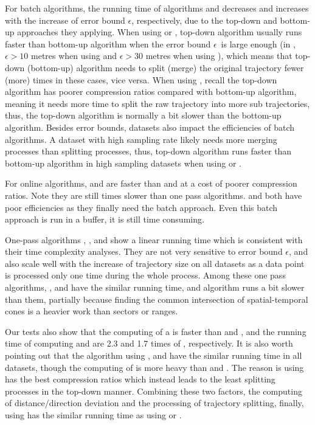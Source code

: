 For batch algorithms, the running time of algorithms \dpa and \tpa decreases and increases with the increase of error bound $\epsilon$, respectively, due to the top-down and bottom-up approaches they applying. When using \ped or \sed, top-down algorithm usually runs faster than bottom-up algorithm when the error bound $\epsilon$~is large enough (\eg in \geolife, $\epsilon >10$ metres when using \ped and $\epsilon >30$ metres when using \sed), which means that top-down (bottom-up) algorithm needs to split (merge) the original trajectory fewer (more) times in these cases, vice versa. When using \dad, recall the top-down algorithm has poorer compression ratios compared with bottom-up algorithm, meaning it needs more time to split the raw trajectory into more sub trajectories, thus, the top-down algorithm is normally a bit slower than the bottom-up algorithm.
Besides error bounds, datasets also impact the efficiencies of batch algorithms. A dataset with high sampling rate likely needs more merging processes than splitting processes, thus, top-down algorithm runs faster than bottom-up algorithm in high sampling datasets when using \ped or \sed.

For online algorithms, \fbqsa and \squishe are faster than \bqsa and \opwa at a cost of poorer compression ratios. Note they are still times slower than one pass algorithms. \bqsa and \opwa both have poor efficiencies as they finally need the batch approach. Even this batch approach is run in a buffer, it is still time consuming.

One-pass algorithms \operb, \siped, \cised and \interval show a linear running time which is consistent with their time complexity analyses. They are not very sensitive to error bound $\epsilon$, and also scale well with the increase of trajectory size on all datasets as a data point is processed only one time during the whole process.
Among these one pass algorithms, \siped, \operb and \interval have the similar running time, and algorithm \cised runs a bit slower than them, partially because finding the common intersection of spatial-temporal cones is a heavier work than sectors or ranges.


Our tests also show that the computing of a \dad is faster than \ped and \sed, and the running time of computing \ped and \sed are 2.3 and 1.7 times of \dad, respectively.
{It is also worth pointing out that the algorithm \dpa using \ped, \sed and \dad have the similar running time in all datasets, though the computing of \ped is more heavy than \sed and \dad. The reason is \dpa using \ped has the best compression ratios which instead leads to the least splitting processes in the top-down manner. Combining these two factors, \ie the computing of distance/direction deviation and the processing of trajectory splitting, finally, \dpa using \ped has the similar running time as \dpa using \dad or \sed.}

